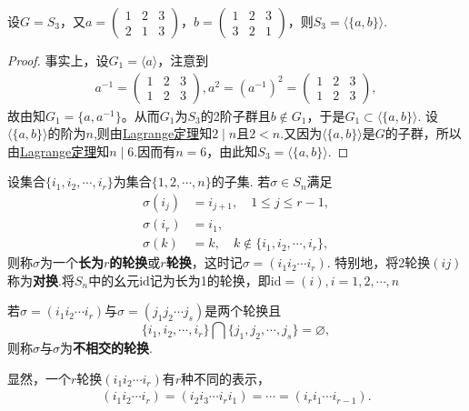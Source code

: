 \documentclass[../../main.tex]{subfiles}%
\begin{document}
\begin{example}
设$G = S_3$，又$a = \begin{pmatrix} 1 & 2 & 3 \\ 2 & 1 & 3 \end{pmatrix}$，$b = \begin{pmatrix} 1 & 2 & 3 \\ 3 & 2 & 1 \end{pmatrix}$，则$S_3 = \langle \{a, b\} \rangle$.
\end{example}
\begin{proof}
事实上，设$G_1 = \langle a\rangle$，注意到
\begin{align*}
a^{-1}=\begin{pmatrix}1&2&3\\1&2&3\end{pmatrix},a^2=(a^{-1})^2=\begin{pmatrix}1&2&3\\1&2&3\end{pmatrix},
\end{align*}
故由知$G_1=\{a,a^{-1}\}$。从而$G_1$为$S_3$的2阶子群且$b \notin G_1$，于是$G_1 \subset \langle \{a, b\} \rangle$. 设$\langle \{a, b\} \rangle$的阶为$n$,则由\hyperref[theorem:抽象代数--Lagrange定理]{Lagrange定理}知$2\mid n$且$2 < n$.又因为$\langle \{a, b\} \rangle$是$G$的子群，所以
由\hyperref[theorem:抽象代数--Lagrange定理]{Lagrange定理}知$n\mid 6$.因而有$n = 6$，由此知$S_3 = \langle \{a, b\} \rangle$.
\end{proof}

\begin{definition}
设集合$\{i_1, i_2, \cdots, i_r\}$为集合$\{1, 2, \cdots, n\}$的子集. 若$\sigma \in S_n$满足
\begin{align*}
\sigma(i_j) &= i_{j+1}, \quad 1 \leqslant j \leqslant r-1, \\
\sigma(i_r) &= i_1, \\
\sigma(k) &= k, \quad k \notin \{i_1, i_2, \cdots, i_r\},
\end{align*}
则称$\sigma$为一个\textbf{长为$r$的轮换}或\textbf{$r$轮换}，这时记$\sigma = (i_1 i_2 \cdots i_r)$.
特别地，将2轮换$(ij)$称为\textbf{对换}.将$S_n$中的幺元$\text{id}$记为长为1的轮换，即$\text{id} = (i),i=1,2,\cdots,n$

若$\sigma = (i_1 i_2 \cdots i_r)$与$\sigma = (j_1 j_2 \cdots j_s)$是两个轮换且
$$\{i_1, i_2, \cdots, i_r\} \bigcap \{j_1, j_2, \cdots, j_s\} = \varnothing,$$
则称$\sigma$与$\sigma$为\textbf{不相交的轮换}.

显然，一个$r$轮换$(i_1 i_2 \cdots i_r)$有$r$种不同的表示，
\begin{align*}
(i_1 i_2 \cdots i_r) = (i_2 i_3 \cdots i_r i_1) = \cdots = (i_r i_1 \cdots i_{r-1}).
\end{align*}
\end{definition}
\end{document}
